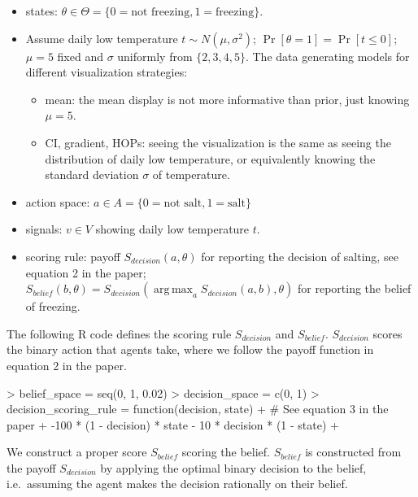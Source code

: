 \documentclass{article}
\DeclareMathOperator*{\argmax}{arg\,max}
\begin{document}
\begin{itemize}
    \item states: $\theta \in \Theta = \{0=\text{not freezing}, 1=\text{freezing}\}$.
    \item Assume daily low temperature $t \sim N(\mu, \sigma^2)$; $\Pr[\theta = 1] = \Pr[t \leq 0]$; $\mu = 5$ fixed and $\sigma$ uniformly from $\{2, 3, 4, 5\}$. The data generating models for different visualization strategies:
    \begin{itemize}
    \item mean: the mean display is not more informative than prior, just knowing $\mu=5$. 
    \item CI, gradient, HOPs: seeing the visualization is the same as seeing the distribution of daily low temperature, or equivalently knowing the standard deviation $\sigma$ of temperature. 
    \end{itemize}
    \item action space: $a \in A = \{0 = \text{not salt}, 1 = \text{salt}\}$%
    \item signals: $v \in V$ showing daily low temperature $t$.
    \item scoring rule: payoff $S_{decision}(a, \theta)$ for reporting the decision of salting, see equation 2 in the paper; $S_{belief}(b, \theta) = S_{decision}(\argmax_{a}{S_{decision}(a, b)}, \theta)$ for reporting the belief of freezing.
\end{itemize}

The following R code defines the scoring rule $S_{decision}$ and $S_{belief}$. $S_{decision}$ scores the binary action that agents take, where we follow the payoff function in equation 2 in the paper. 

\begin{Schunk}
\begin{Sinput}
> belief_space = seq(0, 1, 0.02)
> decision_space = c(0, 1)
> decision_scoring_rule = function(decision, state) {
+   # See equation 3 in the paper
+   -100 * (1 - decision) * state - 10 * decision * (1 - state)
+ }
\end{Sinput}
\end{Schunk}

We construct a proper score $S_{belief}$ scoring the belief. $S_{belief}$ is constructed from the payoff  $S_{decision}$ by applying the optimal binary decision to the belief, i.e.\ assuming the agent makes the decision rationally on their belief.
\end{document}
